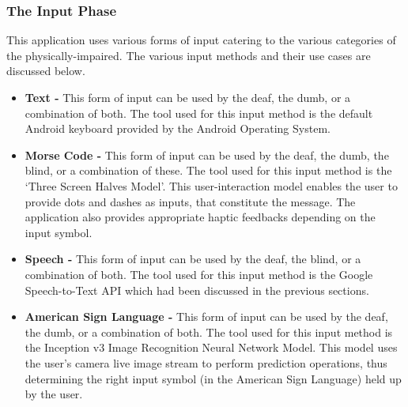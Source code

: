 \documentclass[14pt]{report}
\begin{document}
					\subsubsection{The Input Phase}
						This application uses various forms of input catering to the various categories of the physically-impaired. The various input methods and their use cases are discussed below.
						\begin{itemize}
							\item \textbf{Text - }This form of input can be used by the deaf, the dumb, or a combination of both. The tool used for this input method is the default Android keyboard provided by the Android Operating System.
							\item \textbf{Morse Code - }This form of input can be used by the deaf, the dumb, the blind, or a combination of these. The tool used for this input method is the `Three Screen Halves Model'. This user-interaction model enables the user to provide dots and dashes as inputs, that constitute the message. The application also provides appropriate haptic feedbacks depending on the input symbol.
							\item \textbf{Speech - }This form of input can be used by the deaf, the blind, or a combination of both. The tool used for this input method is the Google Speech-to-Text API which had been discussed in the previous sections.
							\item \textbf{American Sign Language - }This form of input can be used by the deaf, the dumb, or a combination of both. The tool used for this input method is the Inception v3 Image Recognition Neural Network Model. This model uses the user's camera live image stream to perform prediction operations, thus determining the right input symbol (in the American Sign Language) held up by the user.
						\end{itemize}
\end{document}

